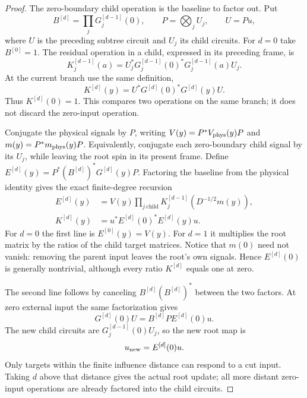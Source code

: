 \begin{proof}
The zero-boundary child operation is the baseline to factor out. Put
\[
 B^{[d]}=\prod_jG_j^{[d-1]}(0),\qquad
 P=\bigotimes_jU_j,\qquad U=Pu,
\]
where $U$ is the preceding subtree circuit and $U_j$ its child
circuits. For $d=0$ take $B^{[0]}=1$. The residual operation in a
child, expressed in its preceding frame, is
\[
 K_j^{[d-1]}(a)
   =U_j^*G_j^{[d-1]}(0)^*G_j^{[d-1]}(a)U_j.
\]
At the current branch use the same definition,
\[
 K^{[d]}(y)=U^*G^{[d]}(0)^*G^{[d]}(y)U.
\]
Thus $K^{[d]}(0)=1$. This compares two operations on the same
branch; it does not discard the zero-input operation.

Conjugate the physical signals by $P$, writing
$V(y)=P^*V_{\rm phys}(y)P$ and $m(y)=P^*m_{\rm phys}(y)P$.
Equivalently, conjugate each zero-boundary child signal by its
$U_j$, while leaving the root spin in its present frame. Define
$E^{[d]}(y)=P^*(B^{[d]})^*G^{[d]}(y)P$. Factoring the baseline
from the physical identity gives the exact finite-degree recursion
\begin{align}
 E^{[d]}(y)
 &=V(y)\prod_{j\ \mathrm{child}}
            K_j^{[d-1]}(D^{-1/2}m(y)),
                         \label{eq:exclusion-E-recursion}\\
 K^{[d]}(y)
 &=u^*E^{[d]}(0)^*E^{[d]}(y)u.
                         \label{eq:exclusion-K-recursion}
\end{align}
For $d=0$ the first line is $E^{[0]}(y)=V(y)$. For $d=1$ it
multiplies the root matrix by the ratios of the child target
matrices. Notice that $m(0)$ need not vanish: removing the parent
input leaves the root's own signals. Hence $E^{[d]}(0)$ is generally
nontrivial, although every ratio $K^{[d]}$ equals one at zero.

The second line follows by canceling $B^{[d]}(B^{[d]})^*$ between
the two factors. At zero external input the same factorization gives
\[
 G^{[d]}(0)U=B^{[d]}P E^{[d]}(0)u.
\]
The new child circuits are $G_j^{[d-1]}(0)U_j$, so the new root
map is
\begin{equation}\label{eq:exclusion-root-update}
                    u_{\rm new}=E^{[d]}(0)u.
\end{equation}
Only targets within the finite influence distance can respond to a
cut input. Taking $d$ above that distance gives the actual root
update; all more distant zero-input operations are already factored
into the child circuits.


\end{proof}

